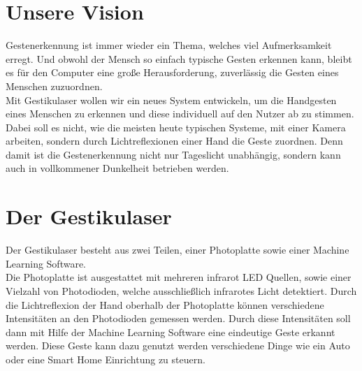 \documentclass{sciposter}
\begin{document}
\begin{multicols}{3}
\setlength{\parindent}{2em}

\section{Unsere Vision}
Gestenerkennung ist immer wieder ein Thema, welches viel Aufmerksamkeit erregt. Und obwohl der Mensch so einfach typische Gesten erkennen kann, bleibt es für den Computer eine große Herausforderung, zuverlässig die Gesten eines Menschen zuzuordnen. \\
Mit Gestikulaser wollen wir ein neues System entwickeln, um die Handgesten eines Menschen zu erkennen und diese individuell auf den Nutzer ab zu stimmen. Dabei soll es nicht, wie die meisten heute typischen Systeme, mit einer Kamera arbeiten, sondern durch Lichtreflexionen einer Hand die Geste zuordnen. Denn damit ist die Gestenerkennung nicht nur Tageslicht unabhängig, sondern kann auch in vollkommener Dunkelheit betrieben werden. \\

\section{Der Gestikulaser}
Der Gestikulaser besteht aus zwei Teilen, einer Photoplatte sowie einer Machine Learning Software. \\
Die Photoplatte ist ausgestattet mit mehreren infrarot LED Quellen, sowie einer Vielzahl von Photodioden, welche ausschließlich infrarotes Licht detektiert. Durch die Lichtreflexion der Hand oberhalb der Photoplatte können verschiedene Intensitäten an den Photodioden gemessen werden. Durch diese Intensitäten soll dann mit Hilfe der Machine Learning Software eine eindeutige Geste erkannt werden. Diese Geste kann dazu genutzt werden verschiedene Dinge wie ein Auto oder eine Smart Home Einrichtung zu steuern.\\


\end{multicols}
\end{document}

